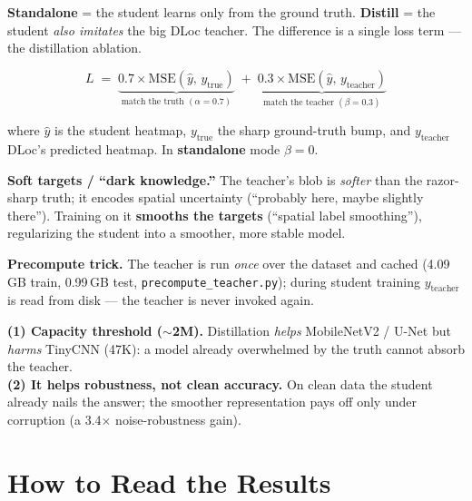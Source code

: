 \documentclass[11pt]{article}
\begin{document}
\textbf{Standalone} = the student learns only from the ground truth. \textbf{Distill} = the student
\emph{also imitates} the big DLoc teacher. The difference is a single loss term --- the distillation
ablation.

\[
  L \;=\; \underbrace{0.7 \times \mathrm{MSE}\!\left(\hat{y},\, y_{\text{true}}\right)}_{\text{match the truth }(\alpha=0.7)}
      \;+\; \underbrace{0.3 \times \mathrm{MSE}\!\left(\hat{y},\, y_{\text{teacher}}\right)}_{\text{match the teacher }(\beta=0.3)}
\]

where $\hat{y}$ is the student heatmap, $y_{\text{true}}$ the sharp ground-truth bump, and
$y_{\text{teacher}}$ DLoc's predicted heatmap. In \textbf{standalone} mode $\beta=0$.

\textbf{Soft targets / ``dark knowledge.''} The teacher's blob is \emph{softer} than the razor-sharp
truth; it encodes spatial uncertainty (``probably here, maybe slightly there''). Training on it
\textbf{smooths the targets} (``spatial label smoothing''), regularizing the student into a smoother, more
stable model.

\textbf{Precompute trick.} The teacher is run \emph{once} over the dataset and cached (4.09\,GB train,
0.99\,GB test, \texttt{precompute\_teacher.py}); during student training $y_{\text{teacher}}$ is read from
disk --- the teacher is never invoked again.

\begin{keybox}
\textbf{(1) Capacity threshold ($\sim$2M).} Distillation \emph{helps} MobileNetV2 / U-Net but \emph{harms}
TinyCNN (47K): a model already overwhelmed by the truth cannot absorb the teacher.\\
\textbf{(2) It helps robustness, not clean accuracy.} On clean data the student already nails the answer;
the smoother representation pays off only under corruption (a 3.4$\times$ noise-robustness gain).
\end{keybox}

\section{How to Read the Results}
\end{document}
